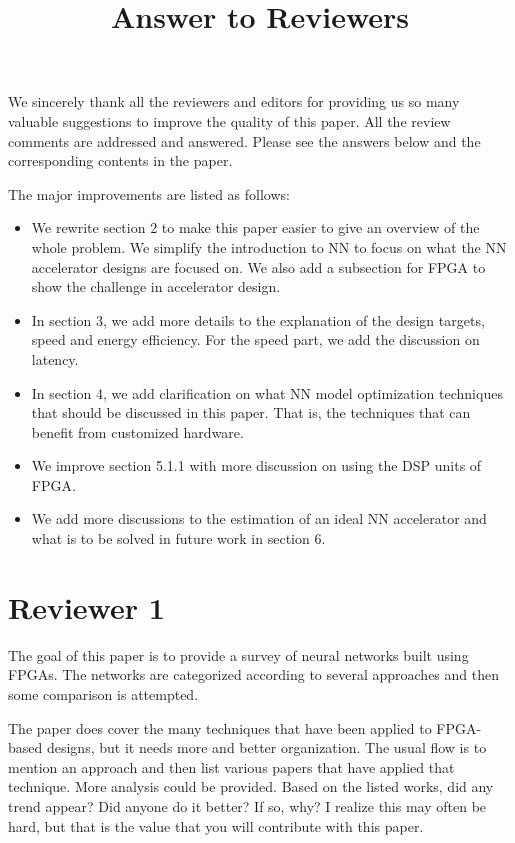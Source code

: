 \documentclass[12pt]{paper}
\title{Answer to Reviewers}
\newcommand{\rev}[1]{{{\color[rgb]{0,0,1}{#1}}}}
\newcommand{\reviewer}[1]{\section*{Reviewer #1}}
\begin{document}
\maketitle

We sincerely thank all the reviewers and editors for providing us so many valuable suggestions to improve the quality of this paper. All the review comments are addressed and answered. Please see the answers below and the corresponding contents in the paper.

\rev{The newly added contents and the major revised contents are marked in blue in the paper and in this letter.}

The major improvements are listed as follows:

\begin{itemize}
    \item We rewrite section 2 to make this paper easier to give an overview of the whole problem. We simplify the introduction to NN to focus on what the NN accelerator designs are focused on. We also add a subsection for FPGA to show the challenge in accelerator design.
    \item In section 3, we add more details to the explanation of the design targets, speed and energy efficiency. For the speed part, we add the discussion on latency.
    \item In section 4, we add clarification on what NN model optimization techniques that should be discussed in this paper. That is, the techniques that can benefit from customized hardware.
    \item We improve section 5.1.1 with more discussion on using the DSP units of FPGA.
    \item We add more discussions to the estimation of an ideal NN accelerator and what is to be solved in future work in section 6.
\end{itemize}

\reviewer{1}

The goal of this paper is to provide a survey of neural networks built using FPGAs. The networks are categorized according to several approaches and then some comparison is attempted.

The paper does cover the many techniques that have been applied to FPGA-based designs, but it needs more and better organization. The usual flow is to mention an approach and then list various papers that have applied that technique. More analysis could be provided. Based on the listed works, did any trend appear? Did anyone do it better? If so, why? I realize this may often be hard, but that is the value that you will contribute with this paper.
\end{document}

